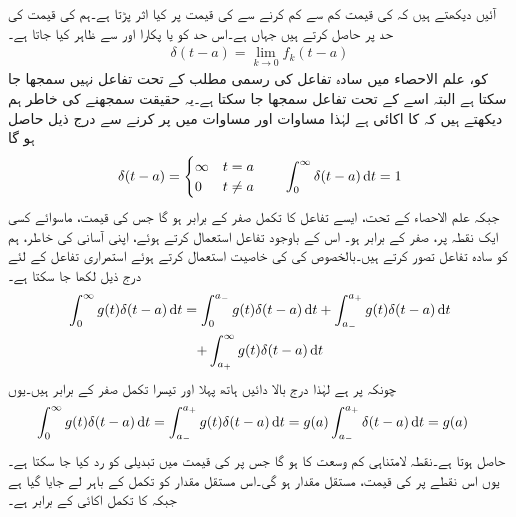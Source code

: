 آئیں دیکھتے ہیں کہ  کی قیمت کم سے کم کرنے سے  کی قیمت پر کیا اثر پڑتا ہے۔ہم  کی قیمت کی حد  پر حاصل کرتے ہیں جہاں  ہے۔اس حد کو  یا  پکارا اور  سے ظاہر کیا جاتا ہے۔
\begin{align}
\delta(t-a)=\lim_{k \to 0} f_k(t-a)
\end{align}
 کو، علم الاحصاء میں سادہ تفاعل کی رسمی مطلب کے تحت تفاعل نہیں سمجھا جا سکتا ہے البتہ اسے  کے تحت تفاعل سمجھا جا سکتا ہے۔یہ حقیقت سمجھنے کی خاطر ہم دیکھتے ہیں کہ  کا  اکائی  ہے لہٰذا  مساوات  اور مساوات  میں  پر کرنے سے درج ذیل حاصل ہو گا
\begin{align}
\delta(t-a)=
\begin{cases}
\infty& t=a\\
0& t\ne a
\end{cases}
\quad \quad \int_{0}^{\infty}\delta(t-a)\dif t=1
\end{align}
جبکہ علم الاحصاء کے تحت، ایسے تفاعل کا تکمل صفر کے برابر ہو گا جس کی قیمت، ماسوائے کسی ایک نقطہ پر، صفر کے برابر ہو۔ اس کے باوجود  تفاعل استعمال کرتے ہوئے، اپنی آسانی کی خاطر، ہم  کو سادہ تفاعل تصور کرتے ہیں۔بالخصوص  کی   کی خاصیت استعمال کرتے ہوئے  استمراری تفاعل  کے لئے درج ذیل لکھا جا سکتا ہے۔
\begin{multline*}
\int_{0}^{\infty}g(t)\delta(t-a)\dif t=\int_{0}^{a_-}g(t)\delta(t-a)\dif t+\int_{a_-}^{a_+}g(t)\delta(t-a)\dif t\\
+\int_{a_+}^{\infty}g(t)\delta(t-a)\dif t
\end{multline*}
چونکہ  پر  ہے لہٰذا درج بالا دائیں ہاتھ پہلا اور تیسرا تکمل صفر کے برابر ہیں۔یوں
\begin{align}\label{مساوات_لاپلاس_اکائی_ضرب_چننے_کی_صلاحیت}
\int_{0}^{\infty}g(t)\delta(t-a)\dif t&=\int_{a_-}^{a_+} g(t)\delta(t-a)\dif t=g(a)\int_{a_-}^{a_+} \delta(t-a)\dif t=g(a)
\end{align}
حاصل ہوتا ہے۔نقطہ  لامتناہی کم وسعت کا ہو گا جس پر  کی قیمت میں تبدیلی کو رد کیا جا سکتا ہے۔یوں اس نقطے  پر  کی قیمت، مستقل مقدار  ہو گی۔اس مستقل مقدار  کو تکمل کے باہر لے جایا گیا ہے جبکہ  کا تکمل اکائی کے برابر ہے۔

